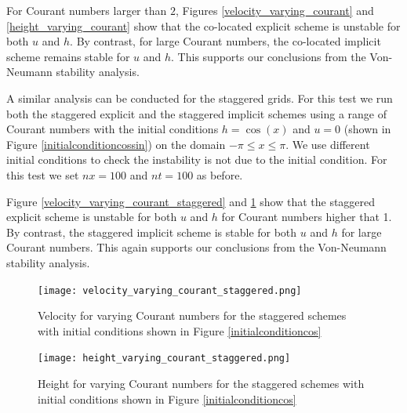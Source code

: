 \documentclass[a4paper, 10pt, notitlepage]{article}
\begin{document}
For Courant numbers larger than $2$, Figures \ref{velocity_varying_courant} and \ref{height_varying_courant} show that the co-located explicit scheme is unstable for both $u$ and $h$. By contrast, for large Courant numbers, the co-located implicit scheme remains stable for $u$ and $h$. This supports our conclusions from the Von-Neumann stability analysis.

A similar analysis can be conducted for the staggered grids. For this test we run both the staggered explicit and the staggered implicit schemes using a range of Courant numbers with the initial conditions $h = \cos(x)$ and $u = 0$ (shown in Figure \ref{initialconditioncossin}) on the domain $-\pi \leq x \leq \pi$. We use different initial conditions to check the instability is not due to the initial condition. For this test we set $nx = 100$ and $nt = 100$ as before. 

Figure \ref{velocity_varying_courant_staggered} and \ref{height_varying_courant_staggered} show that the staggered explicit scheme is unstable for both $u$ and $h$ for Courant numbers higher that 1. By contrast, the staggered implicit scheme is stable for both $u$ and $h$ for large Courant numbers. This again supports our conclusions from the Von-Neumann stability analysis.

\begin{figure}[H]
	\begin{minipage}{.5\textwidth}
		\ContinuedFloat*
		\captionsetup{width=0.9\textwidth}
		\captionsetup{justification=centering}
		\texttt{[image: velocity\_varying\_courant\_staggered.png]}
		\caption{\label{velocity_varying_courant_staggered} Velocity for varying Courant numbers for the staggered schemes with initial conditions shown in Figure \ref{initialconditioncos}}
	\end{minipage}
	\begin{minipage}{.5\textwidth}
		\ContinuedFloat
		\captionsetup{width=0.9\textwidth}
		\captionsetup{justification=centering}
		\texttt{[image: height\_varying\_courant\_staggered.png]}
		\caption{\label{height_varying_courant_staggered} Height for varying Courant numbers for the staggered schemes with initial conditions shown in Figure \ref{initialconditioncos}} 
	\end{minipage}
\end{figure}
\end{document}
